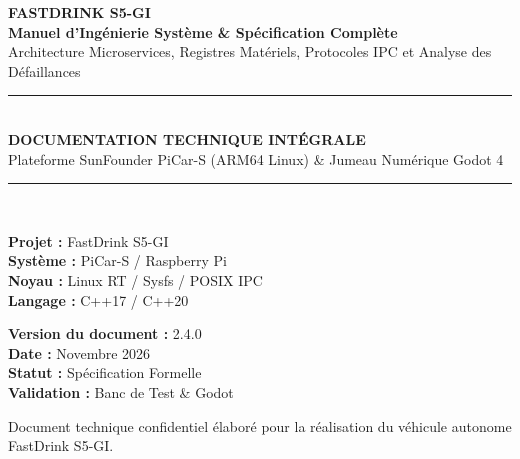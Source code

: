 \documentclass[11pt,a4paper,titlepage]{report}
\begin{document}
\begin{titlepage}
    \centering
    \vspace*{1cm}
    
    {\Huge \bfseries FASTDRINK S5-GI}\\[0.5cm]
    {\LARGE \bfseries Manuel d'Ingénierie Système \& Spécification Complète}\\[0.3cm]
    {\Large Architecture Microservices, Registres Matériels, Protocoles IPC et Analyse des Défaillances}\\[1.5cm]
    
    \rule{\linewidth}{0.5mm}\\[0.4cm]
    {\huge \bfseries DOCUMENTATION TECHNIQUE INTÉGRALE}\\[0.2cm]
    {\large Plateforme SunFounder PiCar-S (ARM64 Linux) \& Jumeau Numérique Godot 4}\\[0.4cm]
    \rule{\linewidth}{0.5mm}\\[2.5cm]
    
    \begin{minipage}{0.48\textwidth}
        \begin{flushleft} \large
            \textbf{Projet :} FastDrink S5-GI\\
            \textbf{Système :} PiCar-S / Raspberry Pi\\
            \textbf{Noyau :} Linux RT / Sysfs / POSIX IPC\\
            \textbf{Langage :} C++17 / C++20
        \end{flushleft}
    \end{minipage}
    \begin{minipage}{0.48\textwidth}
        \begin{flushright} \large
            \textbf{Version du document :} 2.4.0\\
            \textbf{Date :} Novembre 2026\\
            \textbf{Statut :} Spécification Formelle\\
            \textbf{Validation :} Banc de Test \& Godot
        \end{flushright}
    \end{minipage}

    \vfill
    {\small Document technique confidentiel élaboré pour la réalisation du véhicule autonome FastDrink S5-GI.\par}
\end{titlepage}

\tableofcontents
\newpage

\listoffigures
\listoftables
\newpage







\end{document}
